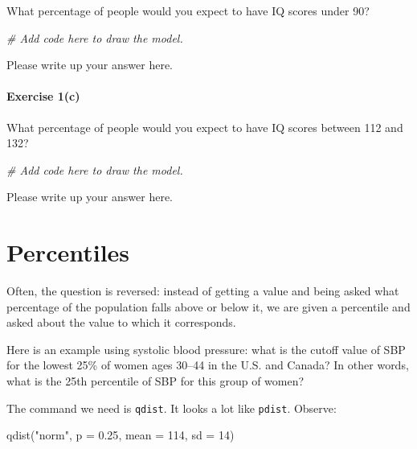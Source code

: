 \documentclass[
]{book}
\newenvironment{Shaded}{\begin{snugshade}}{\end{snugshade}}
\newcommand{\AttributeTok}[1]{\textcolor[rgb]{0.77,0.63,0.00}{#1}}
\newcommand{\CommentTok}[1]{\textcolor[rgb]{0.56,0.35,0.01}{\textit{#1}}}
\newcommand{\DecValTok}[1]{\textcolor[rgb]{0.00,0.00,0.81}{#1}}
\newcommand{\FloatTok}[1]{\textcolor[rgb]{0.00,0.00,0.81}{#1}}
\newcommand{\FunctionTok}[1]{\textcolor[rgb]{0.00,0.00,0.00}{#1}}
\newcommand{\NormalTok}[1]{#1}
\newcommand{\StringTok}[1]{\textcolor[rgb]{0.31,0.60,0.02}{#1}}
\begin{document}
What percentage of people would you expect to have IQ scores under 90?

\begin{Shaded}
\begin{Highlighting}[]
\CommentTok{\# Add code here to draw the model.}
\end{Highlighting}
\end{Shaded}

Please write up your answer here.

\hypertarget{exercise-1c}{%
\paragraph*{Exercise 1(c)}\label{exercise-1c}}

What percentage of people would you expect to have IQ scores between 112 and 132?

\begin{Shaded}
\begin{Highlighting}[]
\CommentTok{\# Add code here to draw the model.}
\end{Highlighting}
\end{Shaded}

Please write up your answer here.

\hypertarget{normal-percentiles}{%
\section{Percentiles}\label{normal-percentiles}}

Often, the question is reversed: instead of getting a value and being asked what percentage of the population falls above or below it, we are given a percentile and asked about the value to which it corresponds.

Here is an example using systolic blood pressure: what is the cutoff value of SBP for the lowest 25\% of women ages 30--44 in the U.S. and Canada? In other words, what is the 25th percentile of SBP for this group of women?

The command we need is \texttt{qdist}. It looks a lot like \texttt{pdist}. Observe:

\begin{Shaded}
\begin{Highlighting}[]
\FunctionTok{qdist}\NormalTok{(}\StringTok{"norm"}\NormalTok{, }\AttributeTok{p =} \FloatTok{0.25}\NormalTok{, }\AttributeTok{mean =} \DecValTok{114}\NormalTok{, }\AttributeTok{sd =} \DecValTok{14}\NormalTok{)}
\end{Highlighting}
\end{Shaded}
\end{document}
